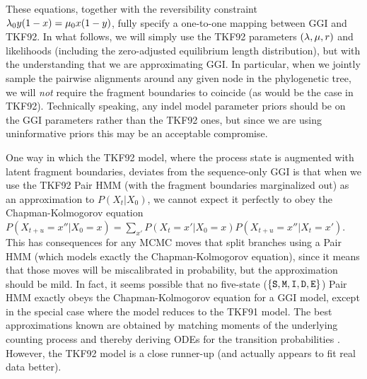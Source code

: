 These equations, together with the reversibility constraint
$\lambda_0 y (1-x) = \mu_0 x (1-y)$,
fully specify a one-to-one mapping between GGI and TKF92.
In what follows, we will simply use the TKF92 parameters
$(\lambda, \mu, r)$ and likelihoods
(including the zero-adjusted equilibrium length distribution),
but with the understanding that we are approximating GGI.
In particular, when we jointly sample the pairwise alignments around any
given node in the phylogenetic tree, we will {\em not} require the fragment
boundaries to coincide (as would be the case in TKF92).
Technically speaking, any indel model parameter priors should be on the GGI parameters
rather than the TKF92 ones, but since we are using uninformative priors
this may be an acceptable compromise.

One way in which the TKF92 model, where the process state is augmented with latent fragment boundaries,
deviates from the sequence-only GGI is that when we use the TKF92 Pair HMM
(with the fragment boundaries marginalized out) as an approximation to $P(X_t|X_0)$,
we cannot expect it perfectly to obey the
Chapman-Kolmogorov equation $P(X_{t+u}=x''|X_0=x) = \sum_{x'} P(X_t=x'|X_0=x)P(X_{t+u}=x''|X_t=x')$.
This has consequences for any MCMC moves that split branches using a Pair HMM
(which models exactly the Chapman-Kolmogorov equation), since it means that those moves will be
miscalibrated in probability, but the approximation should be mild.
In fact, it seems possible that no five-state ($\{{\tt S},{\tt M},{\tt I},{\tt D},{\tt E}\}$) Pair HMM exactly obeys the Chapman-Kolmogorov equation
for a GGI model, except in the special case where the model reduces to the TKF91 model.
The best approximations known are obtained by matching moments of the underlying counting process
and thereby deriving ODEs for the transition probabilities \cite{Holmes2020}.
However, the TKF92 model is a close runner-up (and actually appears to fit real data better).
